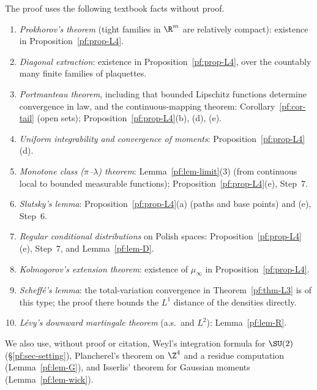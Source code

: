 The proof uses the following textbook facts without proof.
\begin{enumerate}
\item \emph{Prokhorov's theorem} (tight families in $\R^m$ are relatively compact): existence in Proposition~\ref{pf:prop-L4}.
\item \emph{Diagonal extraction}: existence in Proposition~\ref{pf:prop-L4}, over the countably many finite families of plaquettes.
\item \emph{Portmanteau theorem}, including that bounded Lipschitz functions determine convergence in law, and the continuous-mapping theorem: Corollary~\ref{pf:cor-tail} (open sets); Proposition~\ref{pf:prop-L4}(b), (d), (e).
\item \emph{Uniform integrability and convergence of moments}: Proposition~\ref{pf:prop-L4}(d).
\item \emph{Monotone class ($\pi$--$\lambda$) theorem}: Lemma~\ref{pf:lem-limit}(3) (from continuous local to bounded measurable functions); Proposition~\ref{pf:prop-L4}(e), Step~7.
\item \emph{Slutsky's lemma}: Proposition~\ref{pf:prop-L4}(a) (paths and base points) and (e), Step~6.
\item \emph{Regular conditional distributions} on Polish spaces: Proposition~\ref{pf:prop-L4}(e), Step~7, and Lemma~\ref{pf:lem-D}.
\item \emph{Kolmogorov's extension theorem}: existence of $\mu_\infty$ in Proposition~\ref{pf:prop-L4}.
\item \emph{Scheff\'e's lemma}: the total-variation convergence in Theorem~\ref{pf:thm-L3} is of this type; the proof there bounds the $L^1$ distance of the densities directly.
\item \emph{L\'evy's downward martingale theorem} (a.s.\ and $L^2$): Lemma~\ref{pf:lem-R}.
\end{enumerate}
We also use, without proof or citation, Weyl's integration formula for $\SU(2)$ (\S\ref{pf:sec-setting}), Plancherel's theorem on $\Z^4$ and a residue computation (Lemma~\ref{pf:lem-G}), and Isserlis' theorem for Gaussian moments (Lemma~\ref{pf:lem-wick}).
